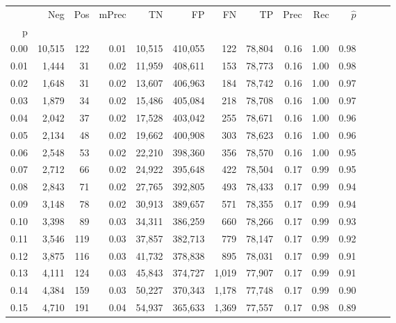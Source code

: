 \begin{tabular}{rrrrrrrrrrrrrr}
\toprule
{} &     Neg &    Pos & mPrec &       TN &       FP &      FN &      TP &  Prec &   Rec & $\hat{p}$ \\
p    &         &        &       &          &          &         &         &       &       &           \\
\midrule
0.00 &  10,515 &    122 &  0.01 &   10,515 &  410,055 &     122 &  78,804 &  0.16 &  1.00 &      0.98 \\
0.01 &   1,444 &     31 &  0.02 &   11,959 &  408,611 &     153 &  78,773 &  0.16 &  1.00 &      0.98 \\
0.02 &   1,648 &     31 &  0.02 &   13,607 &  406,963 &     184 &  78,742 &  0.16 &  1.00 &      0.97 \\
0.03 &   1,879 &     34 &  0.02 &   15,486 &  405,084 &     218 &  78,708 &  0.16 &  1.00 &      0.97 \\
0.04 &   2,042 &     37 &  0.02 &   17,528 &  403,042 &     255 &  78,671 &  0.16 &  1.00 &      0.96 \\
0.05 &   2,134 &     48 &  0.02 &   19,662 &  400,908 &     303 &  78,623 &  0.16 &  1.00 &      0.96 \\
0.06 &   2,548 &     53 &  0.02 &   22,210 &  398,360 &     356 &  78,570 &  0.16 &  1.00 &      0.95 \\
0.07 &   2,712 &     66 &  0.02 &   24,922 &  395,648 &     422 &  78,504 &  0.17 &  0.99 &      0.95 \\
0.08 &   2,843 &     71 &  0.02 &   27,765 &  392,805 &     493 &  78,433 &  0.17 &  0.99 &      0.94 \\
0.09 &   3,148 &     78 &  0.02 &   30,913 &  389,657 &     571 &  78,355 &  0.17 &  0.99 &      0.94 \\
0.10 &   3,398 &     89 &  0.03 &   34,311 &  386,259 &     660 &  78,266 &  0.17 &  0.99 &      0.93 \\
0.11 &   3,546 &    119 &  0.03 &   37,857 &  382,713 &     779 &  78,147 &  0.17 &  0.99 &      0.92 \\
0.12 &   3,875 &    116 &  0.03 &   41,732 &  378,838 &     895 &  78,031 &  0.17 &  0.99 &      0.91 \\
0.13 &   4,111 &    124 &  0.03 &   45,843 &  374,727 &   1,019 &  77,907 &  0.17 &  0.99 &      0.91 \\
0.14 &   4,384 &    159 &  0.03 &   50,227 &  370,343 &   1,178 &  77,748 &  0.17 &  0.99 &      0.90 \\
0.15 &   4,710 &    191 &  0.04 &   54,937 &  365,633 &   1,369 &  77,557 &  0.17 &  0.98 &      0.89 \\

\end{tabular}
